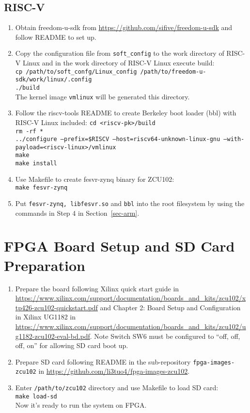 \documentclass[a4paper,11pt]{article}
\begin{document}
\subsection{RISC-V}
\begin{enumerate}
\item Obtain freedom-u-sdk from \url{https://github.com/sifive/freedom-u-sdk} and follow README to set up.

\item Copy the configuration file from {\tt soft\_config} to the work directory of RISC-V Linux and in the work directory of RISC-V Linux execute build:\\
{\tt cp /path/to/soft\_confg/Linux\_config /path/to/freedom-u-sdk/work/linux/.config}\\
{\tt ./build}\\
The kernel image {\tt vmlinux} will be generated this directory.

\item Follow the riscv-tools README to create Berkeley boot loader (bbl) with RISC-V Linux included:
{\tt cd <riscv-pk>/build\\
rm -rf *\\
../configure --prefix=\$RISCV --host=riscv64-unknown-linux-gnu --with-payload=<riscv-linux>/vmlinux\\
make\\
make install}

\item Use Makefile to create fesvr-zynq binary for ZCU102:\\
{\tt make fesvr-zynq}

\item Put {\tt fesvr-zynq, libfesvr.so} and {\tt bbl} into the root filesystem by using the commands in Step 4 in Section~\ref{sec-arm}.
\end{enumerate}

\section{FPGA Board Setup and SD Card Preparation}
\begin{enumerate}
\item Prepare the board following Xilinx quick start guide in \url{https://www.xilinx.com/support/documentation/boards_and_kits/zcu102/xtp426-zcu102-quickstart.pdf} and Chapter 2: Board Setup and Configuration in Xilinx UG1182 in \url{https://www.xilinx.com/support/documentation/boards_and_kits/zcu102/ug1182-zcu102-eval-bd.pdf}. Note Switch SW6 must be configured to ``off, off, off, on'' for allowing SD card boot up.
\item Prepare SD card following README in the sub-repository {\tt fpga-images-zcu102} in \url{https://github.com/li3tuo4/fpga-images-zcu102}.
\item Enter {\tt /path/to/zcu102} directory and use Makefile to load SD card:\\
{\tt make load-sd}\\
Now it's ready to run the system on FPGA.
\end{enumerate}
\end{document}
